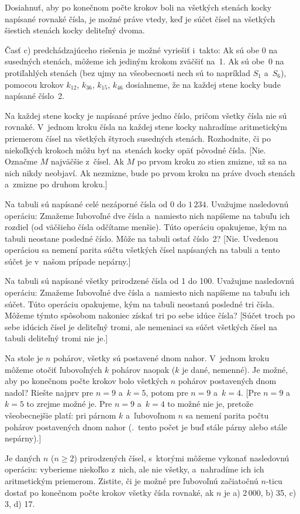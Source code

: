 {\zaver
Dosiahnuť, aby po konečnom počte krokov boli
na všetkých stenách kocky napísané rovnaké čísla, je možné
práve vtedy, keď je súčet čísel na všetkých šiestich stenách kocky
deliteľný dvoma.

\poznamka
Časť c) predchádzajúceho riešenia je možné vyriešiť i~takto:
Ak sú obe 0 na susedných stenách, môžeme ich jediným krokom zväčšiť na~1.
Ak sú obe~0 na protiľahlých stenách (bez ujmy
na všeobecnosti nech sú to napríklad $S_1$ a~$S_6$), pomocou krokov $k_{12}$, $k_{36}$, $k_{15}$, $k_{46}$
dosiahneme, že na každej stene kocky bude napísané číslo~2.

Na každej stene kocky je napísané práve jedno číslo, pričom všetky čísla
nie sú rovnaké. V~jednom kroku čísla na každej stene kocky nahradíme
aritmetickým priemerom čísel na všetkých štyroch susedných stenách.
Rozhodnite, či po niekoľkých krokoch môžu byť na~stenách kocky opäť pôvodné
čísla.
[Nie. Označme $M$ najväčšie z~čísel. Ak $M$ po prvom kroku zo stien
zmizne, už sa na nich nikdy neobjaví. Ak nezmizne, bude po prvom kroku
na práve dvoch stenách a~zmizne po druhom kroku.]

Na tabuli sú napísané celé nezáporné čísla od 0 do $1\,234$. Uvažujme
nasledovnú operáciu: Zmažeme ľubovoľné dve čísla a~namiesto nich napíšeme na
tabuľu ich rozdiel (od väčšieho čísla odčítame menšie). Túto operáciu
opakujeme, kým na tabuli neostane posledné číslo. Môže na tabuli ostať
číslo~2?
[Nie. Uvedenou operáciou sa nemení parita súčtu všetkých čísel
napísaných na tabuli a tento súčet je v~našom prípade nepárny.]

Na tabuli sú napísané všetky prirodzené čísla od 1 do 100. Uvažujme
nasledovnú operáciu: Zmažeme ľubovoľné dve čísla a~namiesto nich napíšeme na
tabuľu ich súčet. Túto operáciu opakujeme, kým na tabuli neostanú
posledné tri čísla. Môžeme týmto spôsobom nakoniec získať tri po
sebe idúce čísla?
[Súčet troch po sebe idúcich čísel je deliteľný tromi,
ale nemeniaci sa súčet všetkých čísel na tabuli deliteľný tromi nie je.]

Na stole je $n$ pohárov, všetky sú postavené dnom nahor.
V~jednom kroku môžeme otočiť ľubovoľných $k$ pohárov naopak ($k$ je
dané, nemenné). Je možné, aby po konečnom počte krokov bolo všetkých
$n$ pohárov postavených dnom nadol? Riešte najprv pre $n=9$ a~$k=5$,
potom pre $n=9$ a~$k=4$.
[Pre $n=9$ a~$k=5$ to zrejme možné je. Pre $n=9$
a~$k=4$ to možné nie je, pretože všeobecnejšie platí: pri párnom $k$ a~ľubovoľnom
$n$ sa nemení parita počtu pohárov postavených dnom nahor (\tj.~tento počet
je buď stále párny alebo stále nepárny).]

Je daných $n$ ($n\ge 2$) prirodzených čísel, s~ktorými môžeme
vykonať nasledovnú operáciu: vyberieme niekoľko z~nich, ale nie
všetky, a~nahradíme ich ich aritmetickým priemerom. Zistite,
či je možné pre ľubovoľnú začiatočnú $n$-ticu dostať po konečnom
počte krokov všetky čísla rovnaké, ak $n$ je
a) 2\,000, b) 35, c) 3, d) 17.
\vpravo{[51--B--I--4]}
}

